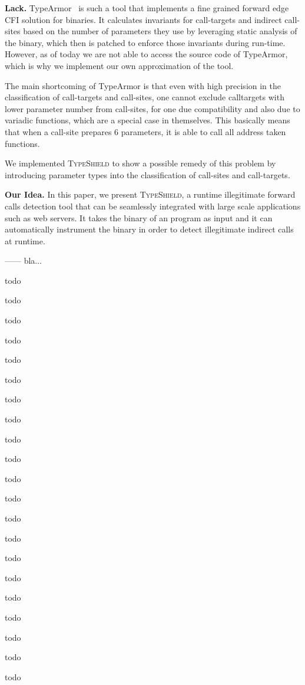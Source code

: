 \textbf{Lack.} TypeArmor~\cite{veen:typearmor} is such a tool that implements a fine grained forward edge CFI 
solution for binaries. It calculates invariants for call-targets and indirect call-sites based on
the number of parameters they use by leveraging static analysis of the binary, which then is
patched to enforce those invariants during run-time. However, as of today we are not able to 
access the source code of TypeArmor, which is why we implement our own approximation of the 
tool.

The main shortcoming of TypeArmor is that even with high precision in the classification of 
call-targets and call-sites, one cannot exclude calltargets with lower parameter number from 
call-sites, for one due compatibility and also due to variadic functions, which are a special
case in themselves. This basically means that when a call-site prepares 6 parameters, it is 
able to call all address taken functions.

We implemented \textsc{TypeShield} to show a possible remedy of this problem by introducing
parameter types into the classification of call-sites and call-targets. 

\textbf{Our Idea.} In this paper, we present \textsc{TypeShield}, a runtime illegitimate forward 
calls detection tool that can be seamlessly integrated with large scale applications such as web servers.
It takes the binary of an program as input and it can automatically instrument the binary in order
to detect illegitimate indirect calls at runtime.

------
bla...

todo

todo


todo

todo

todo


todo


todo

todo

todo

todo

todo


todo

todo

todo

todo

todo

todo

todo

todo

todo


todo


